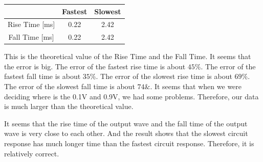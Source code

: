 \documentclass{article}
\begin{document}
\begin{tabular}{|c|c|c|}
	\centering
	& Fastest & Slowest \\ 
	\hline 
    Rise Time [ms]	& 0.22 & 2.42 \\ 
	\hline 
	Fall Time [ms]& 0.22 & 2.42 \\ 
	\hline 
\end{tabular} 

This is the theoretical value of the Rise Time and the Fall Time. It seems that the error is big. The error of the fastest rise time is about $45\%$. The error of the fastest fall time is about $35\%$. The error of the slowest rise time is about $69\%$. The error of the slowest fall time is about $74\&$. It seems that when we were deciding where is the 0.1V and 0.9V, we had some problems. Therefore, our data is much larger than the theoretical value. 

It seems that the rise time of the output wave and the fall time of the output wave is very close to each other.  And the result shows that the slowest circuit response has much longer time than the fastest circuit response. Therefore, it is relatively correct.
\end{document}
